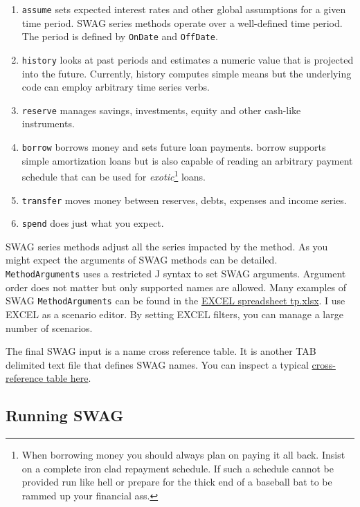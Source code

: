 \begin{enumerate}
\def\labelenumi{\arabic{enumi}.}
\item
  \texttt{assume} sets expected interest rates and other global
  assumptions for a given time period. SWAG series methods operate over
  a well-defined time period. The period is defined by \texttt{OnDate}
  and \texttt{OffDate}.
\item
  \texttt{history} looks at past periods and estimates a numeric value
  that is projected into the future. Currently, history computes simple
  means but the underlying code can employ arbitrary time series verbs.
\item
  \texttt{reserve} manages savings, investments, equity and other
  cash-like instruments.
\item
  \texttt{borrow} borrows money and sets future loan payments. borrow
  supports simple amortization loans but is also capable of reading an
  arbitrary payment schedule that can be used for
  \emph{exotic}\footnote{When borrowing money you should always plan on
    paying it all back. Insist on a complete iron clad repayment
    schedule. If such a schedule cannot be provided run like hell or
    prepare for the thick end of a baseball bat to be rammed up your
    financial ass.} loans.
\item
  \texttt{transfer} moves money between reserves, debts, expenses and
  income series.
\item
  \texttt{spend} does just what you expect.
\end{enumerate}

SWAG series methods adjust all the series impacted by the method. As you
might expect the arguments of SWAG methods can be detailed.
\texttt{MethodArguments} uses a restricted J syntax to set SWAG
arguments. Argument order does not matter but only supported names are
allowed. Many examples of SWAG \texttt{MethodArguments} can be found in
the
\href{https://github.com/bakerjd99/jacks/blob/master/swag/tests/tp.xlsx}{EXCEL
spreadsheet tp.xlsx}. I use EXCEL as a scenario editor. By setting EXCEL
filters, you can manage a large number of scenarios.

The final SWAG input is a name cross reference table. It is another TAB
delimited text file that defines SWAG names. You can inspect a typical
\href{https://github.com/bakerjd99/jacks/blob/master/swag/tests/CrossReference.txt}{cross-reference
table here}.

\subsection*{Running SWAG}%

